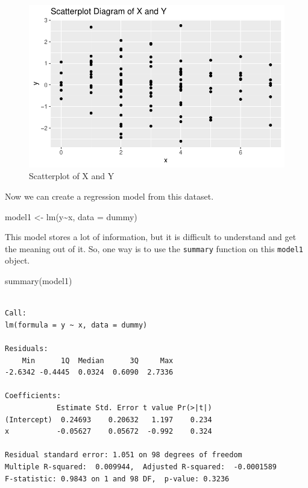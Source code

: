 \documentclass[
  letterpaper,
  twoside,
  openright,
  headsepline,
  footsepline,
  listof = totocnumbered,
  chapterprefix = true,
  titlepage = false]{scrbook}
\newenvironment{Shaded}{\begin{snugshade}}{\end{snugshade}}
\newcommand{\AttributeTok}[1]{\textcolor[rgb]{0.40,0.45,0.13}{#1}}
\newcommand{\FunctionTok}[1]{\textcolor[rgb]{0.28,0.35,0.67}{#1}}
\newcommand{\NormalTok}[1]{\textcolor[rgb]{0.00,0.23,0.31}{#1}}
\newcommand{\OtherTok}[1]{\textcolor[rgb]{0.00,0.23,0.31}{#1}}
\newcommand{\SpecialCharTok}[1]{\textcolor[rgb]{0.37,0.37,0.37}{#1}}
\begin{document}
\begin{figure}[H]

{\centering \includegraphics{lm_files/figure-pdf/fig-scatterplot-1.pdf}

}

\caption{\label{fig-scatterplot}Scatterplot of X and Y}

\end{figure}

Now we can create a regression model from this dataset.

\begin{Shaded}
\begin{Highlighting}[numbers=left,,]
\NormalTok{model1 }\OtherTok{\textless{}{-}} \FunctionTok{lm}\NormalTok{(y}\SpecialCharTok{\textasciitilde{}}\NormalTok{x, }\AttributeTok{data =}\NormalTok{ dummy)}
\end{Highlighting}
\end{Shaded}

This model stores a lot of information, but it is difficult to
understand and get the meaning out of it. So, one way is to use the
\texttt{summary} function on this \texttt{model1} object.

\begin{Shaded}
\begin{Highlighting}[numbers=left,,]
\FunctionTok{summary}\NormalTok{(model1)}
\end{Highlighting}
\end{Shaded}

\begin{verbatim}

Call:
lm(formula = y ~ x, data = dummy)

Residuals:
    Min      1Q  Median      3Q     Max 
-2.6342 -0.4445  0.0324  0.6090  2.7336 

Coefficients:
            Estimate Std. Error t value Pr(>|t|)
(Intercept)  0.24693    0.20632   1.197    0.234
x           -0.05627    0.05672  -0.992    0.324

Residual standard error: 1.051 on 98 degrees of freedom
Multiple R-squared:  0.009944,  Adjusted R-squared:  -0.0001589 
F-statistic: 0.9843 on 1 and 98 DF,  p-value: 0.3236
\end{verbatim}
\end{document}
